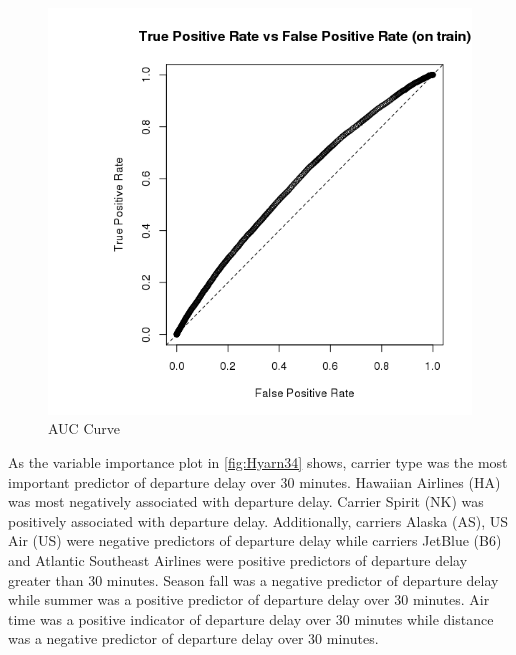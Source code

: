 \documentclass[12pt,twoside]{amherstthesis}
\begin{document}
  \begin{figure}[htbp]
  \centering
  \includegraphics[scale = 0.8,angle = 0]{figure/ROCCurveLog.png}
  \caption[AUC Curve]{\normalsize{AUC Curve}}
  \label{fig:Hyarn48}
  \end{figure}
  
  \clearpage
  
  As the variable importance plot in \autoref{fig:Hyarn34} shows, carrier
  type was the most important predictor of departure delay over 30
  minutes. Hawaiian Airlines (HA) was most negatively associated with
  departure delay. Carrier Spirit (NK) was positively associated with
  departure delay. Additionally, carriers Alaska (AS), US Air (US) were
  negative predictors of departure delay while carriers JetBlue (B6) and
  Atlantic Southeast Airlines were positive predictors of departure delay
  greater than 30 minutes. Season fall was a negative predictor of
  departure delay while summer was a positive predictor of departure delay
  over 30 minutes. Air time was a positive indicator of departure delay
  over 30 minutes while distance was a negative predictor of departure
  delay over 30 minutes.
  
  \begin{Shaded}
  \begin{Highlighting}[]
  \end{Highlighting}
  \end{Shaded}
  
\end{document}
